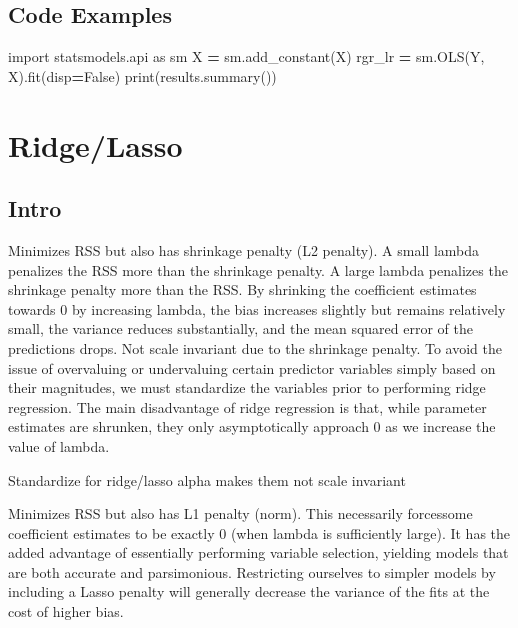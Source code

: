 \documentclass[]{book}
\newenvironment{Shaded}{\begin{snugshade}}{\end{snugshade}}
\newcommand{\ImportTok}[1]{#1}
\newcommand{\VariableTok}[1]{\textcolor[rgb]{0.00,0.00,0.00}{#1}}
\newcommand{\OperatorTok}[1]{\textcolor[rgb]{0.81,0.36,0.00}{\textbf{#1}}}
\newcommand{\BuiltInTok}[1]{#1}
\newcommand{\NormalTok}[1]{#1}
\theoremstyle{definition}
\theoremstyle{definition}
\theoremstyle{definition}
\theoremstyle{remark}
\begin{document}
\subsection{Code Examples}\label{code-examples}

\begin{Shaded}
\begin{Highlighting}[]
\ImportTok{import}\NormalTok{ statsmodels.api }\ImportTok{as}\NormalTok{ sm}
\NormalTok{X }\OperatorTok{=}\NormalTok{ sm.add_constant(X)}
\NormalTok{rgr_lr }\OperatorTok{=}\NormalTok{ sm.OLS(Y, X).fit(disp}\OperatorTok{=}\VariableTok{False}\NormalTok{)}
\BuiltInTok{print}\NormalTok{(results.summary())}
\end{Highlighting}
\end{Shaded}

\section{Ridge/Lasso}\label{ridgelasso}

\subsection{Intro}\label{intro-7}

Minimizes RSS but also has shrinkage penalty (L2 penalty). A small
lambda penalizes the RSS more than the shrinkage penalty. A large lambda
penalizes the shrinkage penalty more than the RSS. By shrinking the
coefficient estimates towards 0 by increasing lambda, the bias increases
slightly but remains relatively small, the variance reduces
substantially, and the mean squared error of the predictions drops. Not
scale invariant due to the shrinkage penalty. To avoid the issue of
overvaluing or undervaluing certain predictor variables simply based on
their magnitudes, we must standardize the variables prior to performing
ridge regression. The main disadvantage of ridge regression is that,
while parameter estimates are shrunken, they only asymptotically
approach 0 as we increase the value of lambda.

Standardize for ridge/lasso alpha makes them not scale invariant

Minimizes RSS but also has L1 penalty (norm). This necessarily
forcessome coefficient estimates to be exactly 0 (when lambda is
sufficiently large). It has the added advantage of essentially
performing variable selection, yielding models that are both accurate
and parsimonious. Restricting ourselves to simpler models by including a
Lasso penalty will generally decrease the variance of the fits at the
cost of higher bias.
\end{document}
